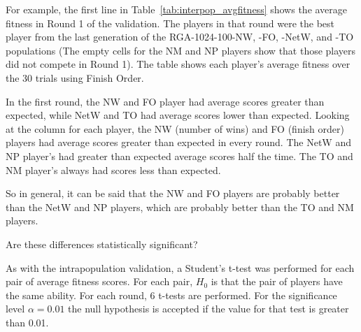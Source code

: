 For example, the first line in Table~\ref{tab:interpop_avgfitness} shows the
average fitness in Round 1 of the validation. The players in that round were the
best player from the last generation of the RGA-1024-100-NW, -FO, -NetW, and -TO
populations (The empty cells for the NM and NP players show that those players
did not compete in Round 1). The table shows each player's average fitness over
the 30 trials using Finish Order.

In the first round, the NW and FO player had average scores greater than
expected, while NetW and TO had average scores lower than expected. Looking at
the column for each player, the NW (number of wins) and FO (finish order)
players had average scores greater than expected in every round. The NetW and NP
player's had greater than expected average scores half the time. The TO and NM
player's always had scores less than expected.

So in general, it can be said that the NW and FO players are probably better
than the NetW and NP players, which are probably better than the TO and NM
players.

Are these differences statistically significant?

As with the intrapopulation validation, a Student's t-test was performed for
each pair of average fitness scores. For each pair, $H_{0}$ is that the pair of
players have the same ability. For each round, 6 t-tests are performed. For the
significance level \(\alpha=0.01\) the null hypothesis is accepted if the
value for that test is greater than 0.01. 

